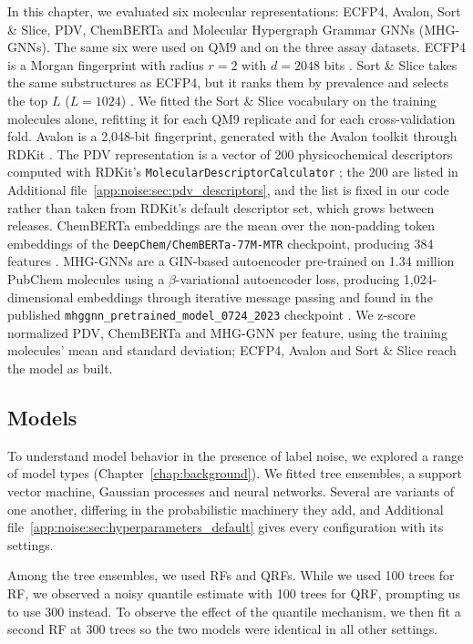 In this chapter, we evaluated six molecular representations: ECFP4, Avalon, Sort \& Slice, PDV, ChemBERTa and Molecular Hypergraph Grammar GNNs (MHG-GNNs). The same six were used on QM9 and on the three assay datasets. ECFP4 is a Morgan fingerprint with radius $r = 2$ with $d = 2048$ bits \citep{rogers2010, rdkit}. Sort \& Slice takes the same substructures as ECFP4, but it ranks them by prevalence and selects the top $L$ ($L=1024$) \citep{sns}. We fitted the Sort \& Slice vocabulary on the training molecules alone, refitting it for each QM9 replicate and for each cross-validation fold.  Avalon is a 2,048-bit fingerprint, generated with the Avalon toolkit through RDKit \citep{avalon, rdkit}. The PDV representation is a vector of 200 physicochemical descriptors computed with RDKit's \texttt{MolecularDescriptorCalculator} \citep{rdkit, Cherkasov2014}; the 200 are listed in Additional file~\ref{app:noise:sec:pdv_descriptors}, and the list is fixed in our code rather than taken from RDKit's default descriptor set, which grows between releases. ChemBERTa embeddings are the mean over the non-padding token embeddings of the \texttt{DeepChem/ChemBERTa-77M-MTR} checkpoint, producing 384 features \citep{Ahmad2022}. MHG-GNNs are a GIN-based autoencoder pre-trained on 1.34 million PubChem molecules using a $\beta$-variational autoencoder loss, producing 1,024-dimensional embeddings through iterative message passing and found in the published \texttt{mhggnn\_pretrained\_model\_0724\_2023} checkpoint \citep{kishimoto2023}. We z-score normalized PDV, ChemBERTa and MHG-GNN per feature, using the training molecules' mean and standard deviation; ECFP4, Avalon and Sort \& Slice reach the model as built.

\subsection{Models}

To understand model behavior in the presence of label noise, we explored a range of model types (Chapter~\ref{chap:background}). We fitted tree ensembles, a support vector machine, Gaussian processes and neural networks. Several are variants of one another, differing in the probabilistic machinery they add, and Additional file~\ref{app:noise:sec:hyperparameters_default} gives every configuration with its settings.

Among the tree ensembles, we used RFs and QRFs. While we used 100 trees for RF, we observed a noisy quantile estimate with 100 trees for QRF, prompting us to use 300 instead. To observe the effect of the quantile mechanism, we then fit a second RF at 300 trees so the two models were identical in all other settings.

